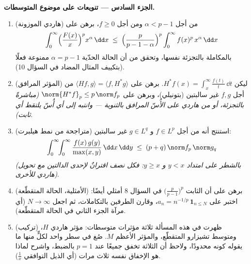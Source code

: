 \begin{problem}
\medskip
\noindent\textbf{الجزء السادس --- تنويعات على موضوع
المتوسطات.}
\begin{enumerate}[resume]
  \item (هاردي الموزونة) من أجل $\alpha < p - 1$ ومن أجل
        $f \geq 0$، برهن على
        \[
        \int_0^\infty\Bigl(\frac{F(x)}x\Bigr)^{p}
        x^{\alpha}\,\dd x \;\leq\;
        \Bigl(\frac{p}{p - 1 - \alpha}\Bigr)^{p}
        \int_0^\infty f(x)^p\,x^{\alpha}\,\dd x
        \]
        بالمكاملة بالتجزئة نفسها، وتحقق من أن الحالة الحدّية
        $\alpha = p - 1$ ممنوعة فعلًا (بتكييف المثال المضاد في
        السؤال 10).
  \item (المؤثر المرافق) ليكن $H^*f(x) =
        \int_x^{\infty}\frac{f(t)}t\,\dd t$. برهن على $\langle
        Hf, g\rangle = \langle f, H^*g\rangle$ من أجل
        $f, g$ غير سالبتين (بتونيلي)، وبرهن على $\norm{H^*f}_p \leq p\,\norm f_p$
        \emph{(مباشرةً بالتجزئة، أو من هاردي على الأُسّ
        المرافق بالثنوية --- وانتبه إلى أي أُسّ يلتقط أي
        ثابت)}.
  \item (متراجحة من نمط هيلبرت) استنتج أنه من أجل $f \in L^p$
        و $g \in L^q$ غير سالبتين:
        \[
        \int_0^\infty\!\!\int_0^\infty
        \frac{f(x)\,g(y)}{\max(x,y)}\,\dd x\,\dd y
        \;\leq\; (p + q)\,\norm f_p\,\norm g_q
        \]
        \emph{(بالشطر على امتداد $y < x$ و $y \geq x$: فكل
        نصف اقترانٌ لإحدى الدالتين مع تحويل هاردي للأخرى)}.
  \item (الأمثلية، الحالة المتقطّعة) برهن على أن الثابت
        $\bigl(\frac p{p-1}\bigr)^p$ في السؤال 8 أمثلي أيضًا: اختبر على $a_n = n^{-1/p}\,\mathbf 1_{n \leq
        N}$،
        وقارن الطرفين بالتكاملات، ثم اجعل $N
        \to \infty$ (أي مرآة
        الجزء الثاني في الحالة المتقطّعة).
  \item (تركيب) ظهرت في هذه المسألة ثلاثة مؤثرات متوسطات:
        مؤثر هاردي $H$، ومتوسط تشيزارو المتقطّع، والمؤثر
        الأعظم $M$. صُغ في سطر واحد لكلٍّ منها ما يقوله كونه
        محدودًا، ولاحظ أن الثلاثة تخفق جميعًا عند $p = 1$
        بالضبط، واشرح لماذا هو الإخفاق نفسه ثلاث مرات (أي
        الذيل التوافقي $\frac1x$).
\end{enumerate}


\end{problem}
